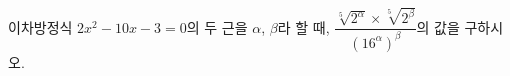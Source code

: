이차방정식 $2x^2-10x-3=0$의 두 근을 $\alpha$, $\beta$라 할 때, $\dfrac{\sqrt[5]{2^{\alpha}}\times\sqrt[5]{2^{\beta}}}{(16^{\alpha})^{\beta}}$의 값을 구하시오.
